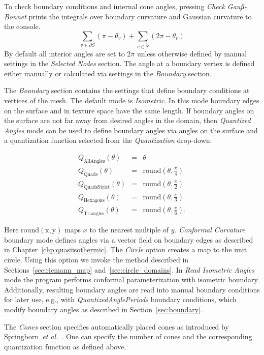 \documentclass[Thesis.tex]{subfiles}
\begin{document}
To check boundary conditions and internal cone angles, pressing \emph{Check Gau\ss-Bonnet} prints the integrals over boundary curvature and Gaussian curvature to the console. 
\[\sum_{v \in \partial S} \left(\pi - \theta_v\right) + \sum_{v \in \mathring{S}}\left(2\pi - \theta_v\right)\]
By default all interior angles are set to $2\pi$ unless otherwise defined by manual settings in the \emph{Selected Nodes} section. The angle at a boundary vertex is defined either manually or calculated via settings in the \emph{Boundary} section.

The \emph{Boundary} section contains the settings that define boundary conditions at vertices of the mesh. 
The default mode is \emph{Isometric}. In this mode boundary edges on the surface and in texture space have the same length. If boundary angles on the surface are not far away from desired angles in the domain, then \emph{Quantized Angles} mode can be used to define boundary angles via angles on the surface and a quantization function selected from the \emph{Quantization} drop-down:

\begin{eqnarray*}
	Q_{\mathrm{AllAngles}}(\theta) &=& \theta \\
	Q_{\mathrm{Quads}}(\theta) &=& \mathrm{round}\left(\theta, \frac{\pi}{4}\right) \\
	Q_{\mathrm{QuadsStrict}}(\theta) &=& \mathrm{round}\left(\theta, \frac{\pi}{2}\right) \\
	Q_{\mathrm{Hexagons}}(\theta) &=& \mathrm{round}\left(\theta, \frac{\pi}{3}\right) \\
	Q_{\mathrm{Triangles}}(\theta) &=& \mathrm{round}\left(\theta, \frac{\pi}{6}\right).
\end{eqnarray*}

Here $\mathrm{round(x,y)}$ maps $x$ to the nearest multiple of $y$.
\emph{Conformal Curvature} boundary mode defines angles via a vector field on boundary edges as described in Chapter~\ref{chp:quasiisothermic}. 
The \emph{Circle} option creates a map to the unit circle. 
Using this option we invoke the method described in Sections~\ref{sec:riemann_map} and~\ref{sec:circle_domains}. 
In \emph{Read Isometric Angles} mode the program performs conformal parameterization with isometric boundary. 
Additionally, resulting boundary angles are read into manual boundary conditions for later use, e.g., with \emph{QuantizedAnglePeriods} boundary conditions, which modify boundary angles as described in Section~\ref{sec:boundary}.

The \emph{Cones} section specifies automatically placed cones as introduced by Springborn~\emph{et al.}\ \cite{Springborn2008}. 
One can specify the number of cones and the corresponding quantization function as defined above.
\end{document}
